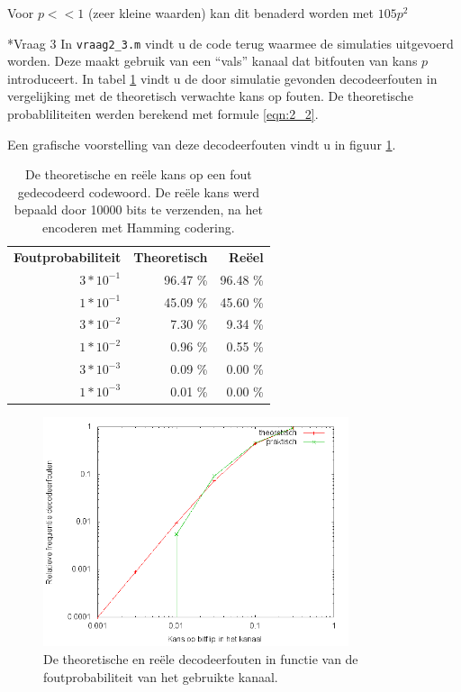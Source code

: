 \documentclass[]{article}
\begin{document}
\begin{section}
\begin{subsection}
    	Voor $p << 1$ (zeer kleine waarden) kan dit benaderd worden met $105p^2$
    \end{subsection}

    \begin{subsection}*{Vraag 3} %
        In \texttt{vraag2\_3.m} vindt u de code terug waarmee de simulaties
        uitgevoerd worden. Deze maakt gebruik van een ``vals'' kanaal dat
        bitfouten van kans $p$ introduceert. In tabel \ref{tab:2_3} vindt u
        de door simulatie gevonden decodeerfouten in vergelijking met de
        theoretisch verwachte kans op fouten. De theoretische probabliliteiten
        werden berekend met formule \ref{eqn:2_2}.

        Een grafische voorstelling van deze decodeerfouten vindt u in figuur
        \ref{fig:2_3}.

        \begin{table}
            \centering
            \begin{tabular}{rrr}
                \textbf{Foutprobabiliteit} &
                \textbf{Theoretisch} &
                \textbf{Re\"eel} \\
                $3 * 10^{-1}$ & 96.47 \% & 96.48 \% \\
                $1 * 10^{-1}$ & 45.09 \% & 45.60 \% \\
                $3 * 10^{-2}$ &  7.30 \% &  9.34 \% \\
                $1 * 10^{-2}$ &  0.96 \% &  0.55 \% \\
                $3 * 10^{-3}$ &  0.09 \% &  0.00 \% \\
                $1 * 10^{-3}$ &  0.01 \% &  0.00 \%
            \end{tabular}
            \caption{De theoretische en re\"ele kans op een fout gedecodeerd
                codewoord. De re\"ele kans werd bepaald door 10000 bits te
            verzenden, na het encoderen met Hamming codering.}
            \label{tab:2_3}
        \end{table}

        \begin{figure}
            \centering
            \includegraphics[width=0.8\textwidth]{vraag2_3.png}
            \caption{De theoretische en re\"ele decodeerfouten in functie
            van de foutprobabiliteit van het gebruikte kanaal.}
            \label{fig:2_3}
        \end{figure}


\end{subsection}
\end{section}
\end{document}
